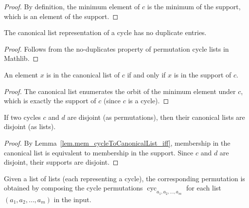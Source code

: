 \begin{proof}
\leanok
By definition, the minimum element of $c$ is the minimum of the support,
which is an element of the support.
\end{proof}

\begin{lemma}
\label{lem.cycleToCanonicalList_nodup}
\leanhelper
\leanok
The canonical list representation of a cycle has no duplicate entries.
\end{lemma}

\begin{proof}
\leanok
Follows from the no-duplicates property of permutation cycle lists in Mathlib.
\end{proof}

\begin{lemma}
\label{lem.mem_cycleToCanonicalList_iff}
\leanhelper
\leanok
An element $x$ is in the canonical list of $c$ if and only if $x$ is in the support of $c$.
\end{lemma}

\begin{proof}
\leanok
The canonical list enumerates the orbit of the minimum element under $c$,
which is exactly the support of $c$ (since $c$ is a cycle).
\end{proof}

\begin{lemma}
\label{lem.cycleToCanonicalList_disjoint}
\leanhelper
\leanok
If two cycles $c$ and $d$ are disjoint (as permutations), then their canonical
lists are disjoint (as lists).
\end{lemma}

\begin{proof}
\leanok
By Lemma~\ref{lem.mem_cycleToCanonicalList_iff}, membership in the canonical list
is equivalent to membership in the support.  Since $c$ and $d$ are disjoint,
their supports are disjoint.
\end{proof}

\begin{definition}
\label{def.dcdListToPerm}
\leanhelper
\leanok
Given a list of lists (each representing a cycle), the corresponding
permutation is obtained by composing the cycle permutations
$\operatorname{cyc}_{a_1, a_2, \ldots, a_m}$ for each list
$(a_1, a_2, \ldots, a_m)$ in the input.
\end{definition}

